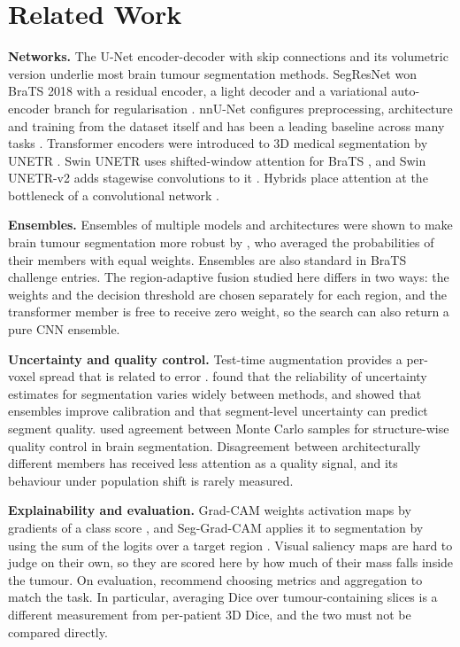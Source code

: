 \documentclass[a4paper,fleqn]{cas-sc}
\begin{document}
\section{Related Work}
\label{sec:related}

\textbf{Networks.} The U-Net encoder-decoder with skip connections \citep{ronneberger2015} and its volumetric version \citep{cicek2016} underlie most brain tumour segmentation methods. SegResNet won BraTS 2018 with a residual encoder, a light decoder and a variational auto-encoder branch for regularisation \citep{myronenko2019}. nnU-Net configures preprocessing, architecture and training from the dataset itself and has been a leading baseline across many tasks \citep{isensee2021}. Transformer encoders were introduced to 3D medical segmentation by UNETR \citep{hatamizadeh2022unetr}. Swin UNETR uses shifted-window attention for BraTS \citep{hatamizadeh2022swin}, and Swin UNETR-v2 adds stagewise convolutions to it \citep{he2023}. Hybrids place attention at the bottleneck of a convolutional network \citep{wang2021,chen2024}.

\textbf{Ensembles.} Ensembles of multiple models and architectures were shown to make brain tumour segmentation more robust by \citet{kamnitsas2018}, who averaged the probabilities of their members with equal weights. Ensembles are also standard in BraTS challenge entries. The region-adaptive fusion studied here differs in two ways: the weights and the decision threshold are chosen separately for each region, and the transformer member is free to receive zero weight, so the search can also return a pure CNN ensemble.

\textbf{Uncertainty and quality control.} Test-time augmentation provides a per-voxel spread that is related to error \citep{wang2019tta}. \citet{jungo2019} found that the reliability of uncertainty estimates for segmentation varies widely between methods, and \citet{mehrtash2020} showed that ensembles improve calibration and that segment-level uncertainty can predict segment quality. \citet{roy2019} used agreement between Monte Carlo samples for structure-wise quality control in brain segmentation. Disagreement between architecturally different members has received less attention as a quality signal, and its behaviour under population shift is rarely measured.

\textbf{Explainability and evaluation.} Grad-CAM weights activation maps by gradients of a class score \citep{selvaraju2017}, and Seg-Grad-CAM applies it to segmentation by using the sum of the logits over a target region \citep{vinogradova2020}. Visual saliency maps are hard to judge on their own, so they are scored here by how much of their mass falls inside the tumour. On evaluation, \citet{maierhein2024} recommend choosing metrics and aggregation to match the task. In particular, averaging Dice over tumour-containing slices is a different measurement from per-patient 3D Dice, and the two must not be compared directly.
\end{document}
